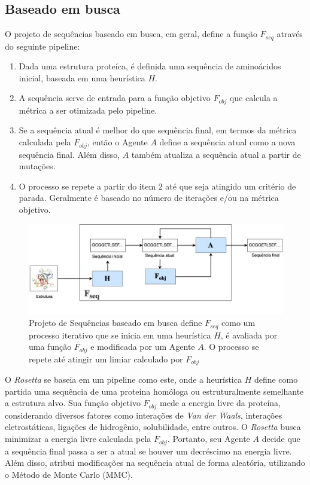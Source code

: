 \subsection{Baseado em busca}
O projeto de sequências baseado em busca, em geral, define a função $F_{seq}$ através do seguinte pipeline:

\begin{enumerate}
  \item Dada uma estrutura proteíca, é definida uma sequência de aminoácidos inicial, baseada em uma  heurística $H$.
  \item A sequência serve de entrada para a função objetivo $F_{obj}$ que calcula a métrica a ser otimizada pelo pipeline.
  \item Se a sequência atual é melhor do que sequência final, em termos da métrica calculada pela $F_{obj}$, então o Agente $A$ define a sequência atual como a nova sequência final. Além disso, $A$ também atualiza a sequência atual a partir de mutações.
  \item O processo se repete a partir do item 2 até que seja atingido um critério de parada. Geralmente é baseado no número de iterações e/ou na métrica objetivo. 
\end{enumerate}

\begin{figure}[H]
  \centering
  \includegraphics[width=.8\textwidth]{figuras/metodologia-SearchBased.jpg}
  \caption{Projeto de Sequências baseado em busca define $F_{seq}$ como um processo iterativo que se inicia em uma 
          heurística $H$, é avaliada por uma função $F_{obj}$ e modificada por um Agente $A$. O processo se repete até 
          atingir um limiar calculado por $F_{obj}$} 
  \label{fig:seqdes_search_based}
\end{figure}

O \textit{Rosetta} \cite{Rosetta} se baseia em um pipeline como este, 
onde a heurística $H$ define como partida uma sequência de uma proteína homóloga ou estruturalmente semelhante a estrutura alvo.  
Sua função objetivo $F_{obj}$ mede a energia livre da proteína,
considerando diversos fatores como interações de \textit{Van der Waals}, interações eletrostáticas, 
ligações de hidrogênio, solubilidade, entre outros. 
O \textit{Rosetta} busca minimizar a energia livre calculada pela $F_{obj}$. Portanto, seu Agente $A$ 
decide que a sequência final passa a ser a atual se houver um decréscimo na energia livre. Além disso, atribui modificações na sequência atual de forma aleatória, utilizando o Método de Monte Carlo (MMC).


